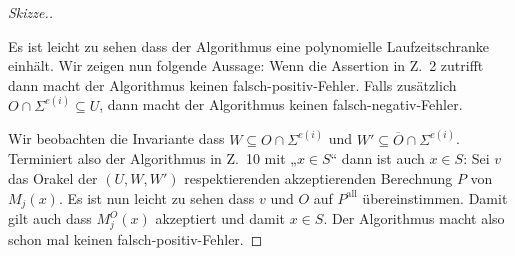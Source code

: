 \documentclass[nofonts]{uebung}
\theoremstyle{definition}
\begin{document}
\begin{proof}[Skizze.]
    \noindent%
    \begin{algorithm}[H]
        \Fn{Search($U$)}{
            \Assert{$e(i)\in M\implies (U=\Sigma^{e(i)-1}0 \lor U=\Sigma^{e(i)-1}1)$}\;
        $W\gets\emptyset,\, W'\gets\emptyset$\;
        \For{$k$ von $0$ bis $p_j(|x|)+1$}{
            $P\gets$ eine $(U, W, W')$ respektierende akzeptierende Berechnung $P$ von $M_j$ auf $x$ mit $|(P^\mathrm{all}\cap U)-(W\cup W')|$ minimal, oder $\bot$ falls keine existiert\;
            \If{$P=\bot$}
            {
                \Return{„$x\not\in S$“}
            }
            \If{alle $q\in P^\mathrm{all}$ mit $|q|=e(i)$ sind in $W\cup W'$}{
                \Return{„$x\in S$“}
            }
            \ForEach{$q\in P^\mathrm{all}$ mit $|q|=e(i)$}
            {
                \lIf{$q\in O$}{$W\gets W\cup\{q\}$}
                \lIf{$q\not\in O$}{$W'\gets W'\cup\{q\}$}
            }
        }
        \Return{„$x\not\in S$“}
        }
    \end{algorithm}
    Es ist leicht zu sehen dass der Algorithmus eine polynomielle Laufzeitschranke einhält.
    Wir zeigen nun folgende Aussage: Wenn die Assertion in Z.~2 zutrifft dann macht der Algorithmus keinen falsch-positiv-Fehler. Falls zusätzlich $O\cap \Sigma^{e(i)}\subseteq U$, dann macht der Algorithmus keinen falsch-negativ-Fehler.

    Wir beobachten die Invariante dass $W\subseteq O\cap \Sigma^{e(i)}$ und $W'\subseteq \overline{O}\cap\Sigma^{e(i)}$. 
    Terminiert also der Algorithmus in Z.~10 mit „$x\in S$“ dann ist auch $x\in S$: Sei $v$ das Orakel der $(U, W, W')$ respektierenden akzeptierenden Berechnung $P$ von $M_j(x)$. Es ist nun leicht zu sehen dass $v$ und $O$ auf $P^\mathrm{all}$ übereinstimmen. Damit gilt auch dass $M_j^O(x)$ akzeptiert und damit $x\in S$.
    Der Algorithmus macht also schon mal keinen falsch-positiv-Fehler.


\end{proof}
\end{document}
